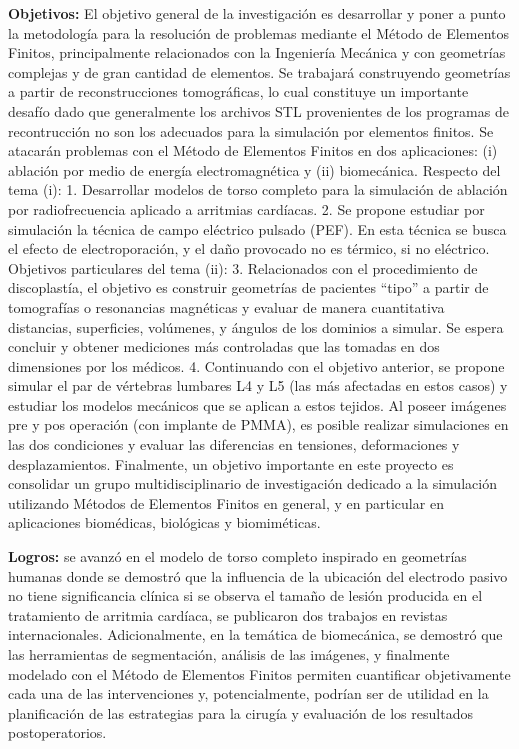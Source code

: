 \documentclass[a4paper,11pt,twoside,final,titlepage,onecolumn,openright]{report}
\begin{document}
\begin{itemize}
{\bf Objetivos:} El objetivo general de la investigación es desarrollar y poner a punto la metodología para la resolución de problemas mediante el Método de Elementos Finitos, principalmente relacionados con la Ingeniería Mecánica y con geometrías complejas y de gran cantidad de elementos. Se trabajará construyendo geometrías a partir de reconstrucciones tomográficas, lo cual constituye un importante desafío dado que generalmente los archivos STL provenientes de los programas de recontrucción no son los adecuados para la simulación por elementos finitos. Se atacarán problemas con el Método de Elementos Finitos en dos aplicaciones: (i) ablación por medio de energía electromagnética y (ii) biomecánica. Respecto del tema (i): 1. Desarrollar modelos de torso completo para la simulación de ablación por radiofrecuencia aplicado a arritmias cardíacas. 2. Se propone estudiar por simulación la técnica de campo eléctrico pulsado (PEF). En esta técnica se busca el efecto de electroporación, y el daño provocado no es térmico, si no eléctrico. Objetivos particulares del tema (ii): 3. Relacionados con el procedimiento de discoplastía, el objetivo es construir geometrías de pacientes “tipo” a partir de tomografías o resonancias magnéticas y evaluar de manera cuantitativa distancias, superficies, volúmenes, y ángulos de los dominios a simular. Se espera concluir y obtener mediciones más controladas que las tomadas en dos dimensiones por los médicos. 4. Continuando con el objetivo anterior, se propone simular el par de vértebras lumbares L4 y L5 (las más afectadas en estos casos) y estudiar los modelos mecánicos que se aplican a estos tejidos. Al poseer imágenes pre y pos operación (con implante de PMMA), es posible realizar simulaciones en las dos condiciones y evaluar las diferencias en tensiones, deformaciones y desplazamientos. Finalmente, un objetivo importante en este proyecto es consolidar un grupo multidisciplinario de investigación dedicado a la simulación utilizando Métodos de Elementos Finitos en general, y en particular en aplicaciones biomédicas, biológicas y biomiméticas. 

{\bf Logros:} se avanzó en el modelo de torso completo inspirado en geometrías humanas donde se demostró que la influencia de la ubicación del electrodo pasivo no tiene significancia clínica si se observa el tamaño de lesión producida en el tratamiento de arritmia cardíaca, se publicaron dos trabajos en revistas internacionales. Adicionalmente, en la temática de biomecánica, se demostró que las herramientas de segmentación, análisis de las imágenes, y finalmente modelado con el Método de Elementos Finitos permiten cuantificar objetivamente cada una de las intervenciones y, potencialmente, podrían ser de utilidad en la planificación de las estrategias para la cirugía y evaluación de los resultados postoperatorios.


\end{itemize}
\end{document}
